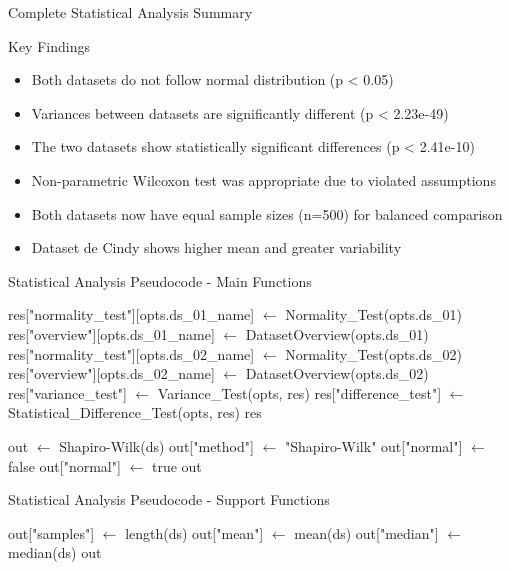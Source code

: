 \documentclass[10pt]{beamer}
\begin{document}
{\begin{frame}{Complete Statistical Analysis Summary}
   \vspace{0.5cm}
   \begin{block}{Key Findings}
   \begin{itemize}
   \item Both datasets do not follow normal distribution (p < 0.05)
   \item Variances between datasets are significantly different (p < 2.23e-49)
   \item The two datasets show statistically significant differences (p < 2.41e-10)
   \item Non-parametric Wilcoxon test was appropriate due to violated assumptions
   \item Both datasets now have equal sample sizes (n=500) for balanced comparison
   \item Dataset de Cindy shows higher mean and greater variability
   \end{itemize}
   \end{block}
   \end{frame}

   \begin{frame}{Statistical Analysis Pseudocode - Main Functions}
   \scriptsize
   \begin{algorithmic}[1]
      \State res["normality\_test"][opts.ds\_01\_name] $\gets$ Normality\_Test(opts.ds\_01)
      \State res["overview"][opts.ds\_01\_name] $\gets$ DatasetOverview(opts.ds\_01)
         \State res["normality\_test"][opts.ds\_02\_name] $\gets$ Normality\_Test(opts.ds\_02)
         \State res["overview"][opts.ds\_02\_name] $\gets$ DatasetOverview(opts.ds\_02)
         \State res["variance\_test"] $\gets$ Variance\_Test(opts, res)
         \State res["difference\_test"] $\gets$ Statistical\_Difference\_Test(opts, res)
      \EndIf
      \State \Return res
   \EndFunction
   
      \State out $\gets$ Shapiro-Wilk(ds)
      \State out["method"] $\gets$ "Shapiro-Wilk"
         \State out["normal"] $\gets$ false
      \Else
         \State out["normal"] $\gets$ true
      \EndIf
      \State \Return out
   \EndFunction
   \end{algorithmic}
   \end{frame}

   \begin{frame}{Statistical Analysis Pseudocode - Support Functions}
   \scriptsize
   \begin{algorithmic}[1]
      \State out["samples"] $\gets$ length(ds)
      \State out["mean"] $\gets$ mean(ds)
      \State out["median"] $\gets$ median(ds)
      \State \Return out
   \EndFunction
   

\end{algorithmic}
\end{frame}}
\end{document}
